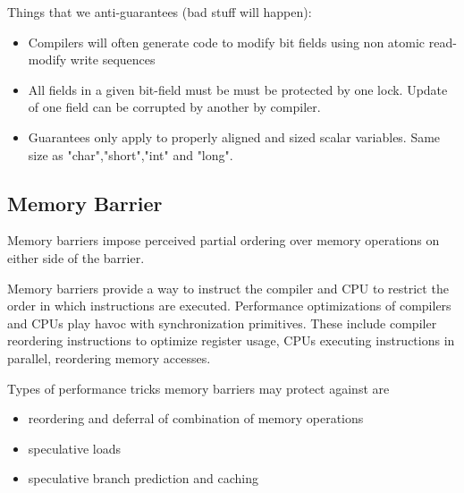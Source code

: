 \documentclass{article}
\begin{document}
Things that we anti-guarantees (bad stuff will happen):

\begin{itemize}


\item Compilers will often generate code to modify bit fields using non
  atomic read-modify write sequences


\item All fields in a given bit-field must be must be protected by one
  lock. Update of one field can be corrupted by another by compiler.
  
\item Guarantees only apply to properly aligned and sized scalar
  variables. Same size as "char","short","int" and "long".  
\end{itemize}



\subsection{Memory Barrier}

Memory barriers impose perceived partial ordering over memory
operations on either side of the barrier.

Memory barriers provide a way to instruct the compiler and CPU to
restrict the order in which instructions are executed. Performance
optimizations of compilers and CPUs play havoc with synchronization
primitives. These include compiler reordering instructions to optimize
register usage, CPUs executing instructions in parallel, reordering
memory accesses.


Types of performance tricks memory barriers may protect against are
\begin{itemize}
\item reordering and deferral of combination of memory operations
\item speculative loads
\item speculative branch prediction and caching
\end{itemize}
\end{document}

